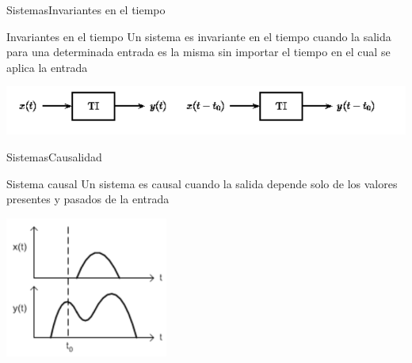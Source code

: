  \begin{frame}{Sistemas}{Invariantes en el tiempo}
    \begin{block}{Invariantes en el tiempo}
       Un sistema es invariante en el tiempo cuando la salida para una determinada entrada es la misma sin importar el tiempo en el cual se aplica la entrada
    \end{block}
    \center\includegraphics[width=1\textwidth]{1_clase/invariante_en_tiempo} \\
    \vfill
 \end{frame}
 \begin{frame}{Sistemas}{Causalidad}
    \begin{block}{Sistema causal}
       Un sistema es causal cuando la salida depende solo de los valores presentes y pasados de la entrada
    \end{block}
    \center\includegraphics[width=0.4\textwidth]{1_clase/causalidad} \\
    \vfill
 \end{frame}
